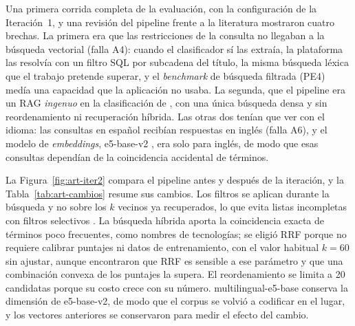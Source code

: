 Una primera corrida completa de la evaluación, con la configuración de la Iteración~1, y una revisión del pipeline frente a la literatura mostraron cuatro brechas. La primera era que las restricciones de la consulta no llegaban a la búsqueda vectorial (falla A4): cuando el clasificador sí las extraía, la plataforma las resolvía con un filtro SQL por subcadena del título, la misma búsqueda léxica que el trabajo pretende superar, y el \textit{benchmark} de búsqueda filtrada (PE4) medía una capacidad que la aplicación no usaba. La segunda, que el pipeline era un RAG \emph{ingenuo} en la clasificación de \citet{Gao2023}, con una única búsqueda densa y sin reordenamiento ni recuperación híbrida. Las otras dos tenían que ver con el idioma: las consultas en español recibían respuestas en inglés (falla A6), y el modelo de \textit{embeddings}, e5-base-v2 \citep{Wang2022E5}, era solo para inglés, de modo que esas consultas dependían de la coincidencia accidental de términos.

La Figura~\ref{fig:art-iter2} compara el pipeline antes y después de la iteración, y la Tabla~\ref{tab:art-cambios} resume sus cambios. Los filtros se aplican durante la búsqueda y no sobre los $k$ vecinos ya recuperados, lo que evita listas incompletas con filtros selectivos \citep{Gollapudi2023, Patel2024}. La búsqueda híbrida aporta la coincidencia exacta de términos poco frecuentes, como nombres de tecnologías; se eligió RRF porque no requiere calibrar puntajes ni datos de entrenamiento, con el valor habitual $k = 60$ sin ajustar, aunque \citet{Bruch2023} encontraron que RRF es sensible a ese parámetro y que una combinación convexa de los puntajes la supera. El reordenamiento se limita a 20 candidatas porque su costo crece con su número. multilingual-e5-base conserva la dimensión de e5-base-v2, de modo que el corpus se volvió a codificar en el lugar, y los vectores anteriores se conservaron para medir el efecto del cambio.

